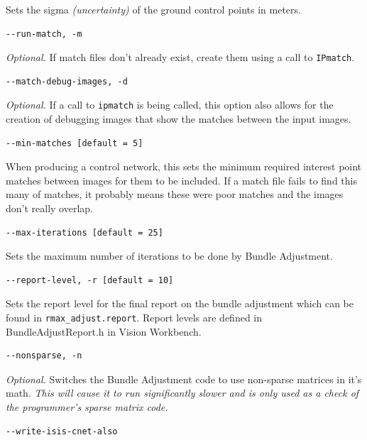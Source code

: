 Sets the sigma \emph{(uncertainty)} of the ground control points in
meters.

\begin{verbatim}
--run-match, -m
\end{verbatim}

\emph{Optional.} If match files don't already exist, create them using a
call to \texttt{IPmatch}.

\begin{verbatim}
--match-debug-images, -d
\end{verbatim}

\emph{Optional.} If a call to \texttt{ipmatch} is being called, this option
also allows for the creation of debugging images that show the matches
between the input images.

\begin{verbatim}
--min-matches [default = 5]
\end{verbatim}

When producing a control network, this sets the minimum required
interest point matches between images for them to be included. If a
match file fails to find this many of matches, it probably means these
were poor matches and the images don't really overlap.

\begin{verbatim}
--max-iterations [default = 25]
\end{verbatim}

Sets the maximum number of iterations to be done by Bundle Adjustment.

\begin{verbatim}
--report-level, -r [default = 10]
\end{verbatim}

Sets the report level for the final report on the bundle adjustment
which can be found in \verb=rmax_adjust.report=. Report levels are defined in
BundleAdjustReport.h in Vision Workbench.

\begin{verbatim}
--nonsparse, -n
\end{verbatim}

\emph{Optional.} Switches the Bundle Adjustment code to use non-sparse
matrices in it's math. \emph{This will cause it to run significantly slower
and is only used as a check of the programmer's sparse matrix code.}

\begin{verbatim}
--write-isis-cnet-also
\end{verbatim}

